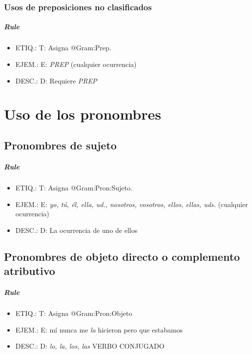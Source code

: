 \documentclass[11pt]{report}
\begin{document}
\subsection{Usos de preposiciones no clasificados}
\paragraph*{Rule}
\begin{itemize}
\item ETIQ.:  T: Asigna @Gram:Prep.
\item EJEM.:  E: \emph{PREP} (cualquier ocurrencia)
\item DESC.:  D: Requiere \emph{PREP}
\end{itemize}

\chapter{Uso de los pronombres}
\section{Pronombres de sujeto}
\paragraph*{Rule}
\begin{itemize}
\item ETIQ.:  T: Asigna @Gram:Pron:Sujeto.
\item EJEM.:  E: \emph{yo, tú, él, ella, ud., nosotros, vosotros, ellos, ellas, uds.} (cualquier ocurrencia)
\item DESC.:  D: La ocurrencia de uno de ellos
\end{itemize}

\section{Pronombres de objeto directo o complemento atributivo}
\paragraph*{Rule}
\begin{itemize}
\item ETIQ.:  T: Asigna @Gram:Pron:Objeto
\item EJEM.:  E: mí nunca me \emph{la} hicieron pero que estabamos
\item DESC.:  D: \emph{lo, la, los, las} VERBO CONJUGADO
\end{itemize}
\end{document}
